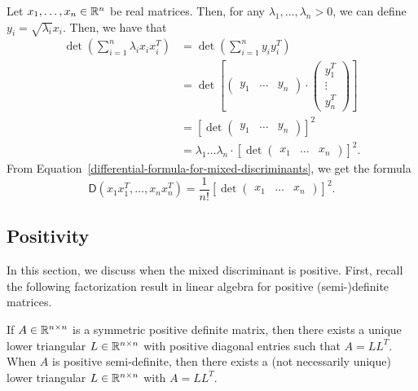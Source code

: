 \documentclass{puthesis-UG}
\begin{document}
\begin{example} \label{mixed-discriminant-calculation-for-rank-1}
	Let $x_1, \ldots, x_n \in \mathbb{R}^n$ be real matrices. Then, for any $\lambda_1, \ldots, \lambda_n > 0$, we can define $y_i = \sqrt{\lambda_i} x_i$. Then, we have that 
	\begin{align*}
		\det \left ( \sum_{i = 1}^n \lambda_i x_i x_i^T \right ) & = \det \left ( \sum_{i = 1}^n y_i y_i^T \right ) \\
		& = \det \left [ \begin{pmatrix} y_1 & \ldots & y_n \end{pmatrix} \cdot \begin{pmatrix} y_1^T \\ \vdots \\ y_n^T \end{pmatrix} \right ]\\
		& = \left [ \det \begin{pmatrix} y_1 & \ldots & y_n \end{pmatrix} \right ]^2 \\
		& = \lambda_1 \ldots \lambda_n \cdot \left [ \det \begin{pmatrix} x_1 & \ldots & x_n \end{pmatrix} \right ]^2.
	\end{align*}
	From Equation~\ref{differential-formula-for-mixed-discriminants}, we get the formula 
	\[
		\mathsf{D} (x_1x_1^T, \ldots, x_nx_n^T) = \frac{1}{n!}\left [ \det \begin{pmatrix} x_1 & \ldots & x_n \end{pmatrix} \right ]^2.
	\]
\end{example}



\subsection{Positivity}

In this section, we discuss when the mixed discriminant is positive. First, recall the following factorization result in linear algebra for positive (semi-)definite matrices. 

\begin{thm}  \label{cholesky}
	If $A \in \mathbb{R}^{n \times n}$ is a symmetric positive definite matrix, then there exists a unique lower triangular $L \in \mathbb{R}^{n \times n}$ with positive diagonal entries such that $A = LL^T$. When $A$ is positive semi-definite, then there exists a (not necessarily unique) lower triangular $L \in \mathbb{R}^{n \times n}$ with $A = LL^T$. 
\end{thm}
\end{document}
